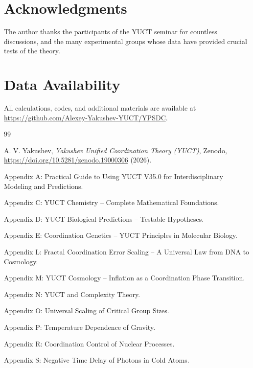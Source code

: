 \documentclass[12pt,a4paper]{article}
\theoremstyle{remark}
\begin{document}
	\section*{Acknowledgments}
	
	The author thanks the participants of the YUCT seminar for countless discussions, and the many experimental groups whose data have provided crucial tests of the theory. 
	
	\section*{Data Availability}
	
	All calculations, codes, and additional materials are available at \url{https://github.com/Alexey-Yakushev-YUCT/YPSDC}.
	
	\begin{thebibliography}{99}
		
		A. V. Yakushev, \emph{Yakushev Unified Coordination Theory (YUCT)}, Zenodo, \url{https://doi.org/10.5281/zenodo.19000306} (2026).
		
		Appendix A: Practical Guide to Using YUCT V35.0 for Interdisciplinary Modeling and Predictions.
		
		Appendix C: YUCT Chemistry -- Complete Mathematical Foundations.
		
		Appendix D: YUCT Biological Predictions -- Testable Hypotheses.
		
		Appendix E: Coordination Genetics -- YUCT Principles in Molecular Biology.
		
		Appendix L: Fractal Coordination Error Scaling -- A Universal Law from DNA to Cosmology.
		
		Appendix M: YUCT Cosmology -- Inflation as a Coordination Phase Transition.
		
		Appendix N: YUCT and Complexity Theory.
		
		Appendix O: Universal Scaling of Critical Group Sizes.
		
		Appendix P: Temperature Dependence of Gravity.
		
		Appendix R: Coordination Control of Nuclear Processes.
		
		Appendix S: Negative Time Delay of Photons in Cold Atoms.
		

\end{thebibliography}
\end{document}
